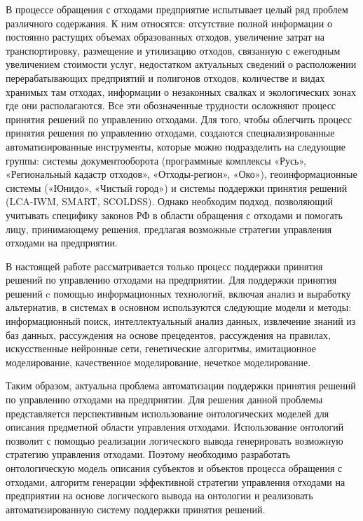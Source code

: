 \documentclass[a4paper]{G2-105}
\begin{document}
В процессе обращения с отходами предприятие испытывает целый ряд проблем различного содержания. К ним относятся: отсутствие полной информации о постоянно растущих объемах образованных отходов, увеличение затрат на транспортировку, размещение и утилизацию отходов, связанную с ежегодным увеличением стоимости услуг, недостатком актуальных сведений о расположении перерабатывающих предприятий и полигонов отходов, количестве и видах хранимых там отходах, информации о незаконных свалках и экологических зонах где они располагаются. Все эти обозначенные трудности осложняют процесс принятия решений по управлению отходами. Для того, чтобы облегчить процесс принятия решения по управлению отходами, создаются специализированные автоматизированные инструменты, которые можно подразделить на следующие группы: системы документооборота (программные комплексы «Русь», «Региональный кадастр отходов», «Отходы-регион», «Око»), геоинформационные системы («Юнидо», «Чистый город») и системы поддержки принятия решений (LCA-IWM, SMART, SCOLDSS). Однако необходим подход, позволяющий учитывать специфику законов РФ в области обращения с отходами и помогать лицу, принимающему решения, предлагая возможные стратегии управления отходами на предприятии.

В настоящей работе рассматривается только процесс поддержки принятия решений по управлению отходами на предприятии. Для поддержки принятия решений c помощью информационных технологий, включая анализ и выработку альтернатив, в системах в основном используются следующие модели и методы: информационный поиск, интеллектуальный анализ данных, извлечение знаний из баз данных, рассуждения на основе прецедентов, рассуждения на правилах, искусственные нейронные сети, генетические алгоритмы, имитационное моделирование, качественное моделирование, нечеткое моделирование.

Таким образом, актуальна проблема автоматизации поддержки принятия решений по управлению отходами на предприятии. Для решения данной проблемы представляется перспективным использование онтологических моделей для описания предметной области управления отходами. Использование онтологий позволит с помощью реализации логического вывода генерировать возможную стратегию управления отходами. Поэтому необходимо разработать онтологическую модель описания субъектов и объектов процесса обращения с отходами, алгоритм генерации эффективной стратегии управления отходами на предприятии на основе логического вывода на онтологии и реализовать автоматизированную систему поддержки принятия решений.
\end{document}
